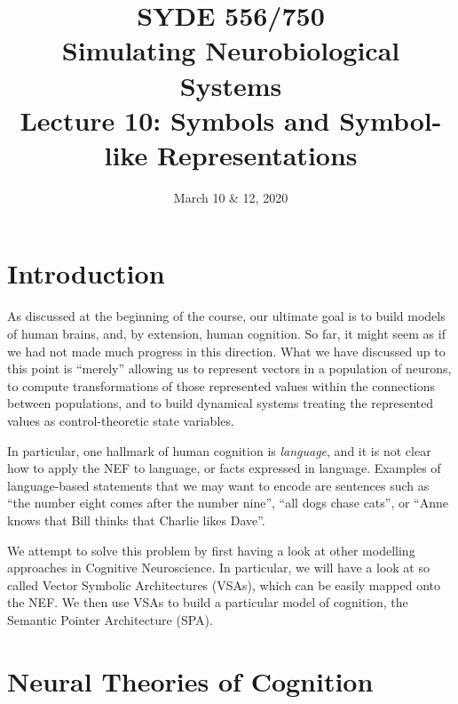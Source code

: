 \documentclass[10pt,letterpaper,oneside]{article}
\date{March 10 \& 12, 2020}
\title{SYDE 556/750 \\ Simulating Neurobiological Systems \\ Lecture 10: Symbols and Symbol-like Representations}
\begin{document}

\section{Introduction}


As discussed at the beginning of the course, our ultimate goal is to build models of human brains, and, by extension, human cognition. So far, it might seem as if we had not made much progress in this direction. What we have discussed up to this point is \enquote{merely} allowing us to represent vectors in a population of neurons, to compute transformations of those represented values within the connections between populations, and to build dynamical systems treating the represented values as control-theoretic state variables.

In particular, one hallmark of human cognition is \emph{language}, and it is not clear how to apply the NEF to language, or facts expressed in language. Examples of language-based statements that we may want to encode are sentences such as \enquote{the number eight comes after the number nine}, \enquote{all dogs chase cats}, or \enquote{Anne knows that Bill thinks that Charlie likes Dave}.

We attempt to solve this problem by first having a look at other modelling approaches in Cognitive Neuroscience. In particular, we will have a look at so called Vector Symbolic Architectures (VSAs), which can be easily mapped onto the NEF. We then use VSAs to build a particular model of cognition, the Semantic Pointer Architecture (SPA).

\section{Neural Theories of Cognition}

\end{document}
